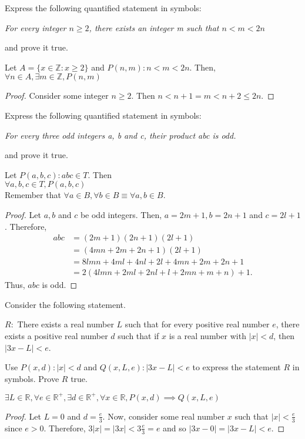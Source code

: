 \documentclass[12pt]{article}
\newcommand{\Z}{\mathbb{Z}}
\newcommand{\R}{\mathbb{R}}
\newenvironment{problem}[2][Problem]{\begin{trivlist}
		\item[\hskip \labelsep {\bfseries #1}\hskip \labelsep {\bfseries #2.}]}{\end{trivlist}}
\newenvironment{solution}[2][Solution]{\begin{trivlist}
		\item[\hskip \labelsep {\bfseries #1}\hskip \labelsep {\bfseries #2.}]}{\end{trivlist}}
\begin{document}
	\begin{problem}{14}
		Express the following quantified statement in symbols:
		\begin{center}
			\textit{For every integer $n\geq 2$, there exists an integer m such that $n<m<2n$}
		\end{center}
		and prove it true.
		\begin{solution}{}
			Let $A=\{x\in \Z: x\geq 2\}$ and $P(n,m):n<m<2n$. Then, \\
			$\forall n\in A, \exists m\in \Z, P(n,m)$ 
			\begin{proof}
				Consider some integer $n\geq 2$. Then $n < n+1 = m < n+2 \leq 2n$. 
			\end{proof}
		\end{solution}
	\end{problem}

	\begin{problem}{24}
		Express the following quantified statement in symbols:
		\begin{center}
			\textit{For every three odd integers a, b and c, their product abc is odd.}
		\end{center}
		and prove it true.
		\begin{solution}{}
			Let $P(a,b,c): abc\in T$. Then\\
			$\forall a,b,c\in T, P(a,b,c)$\\
			Remember that $\forall a\in B, \forall b\in B \equiv \forall a,b \in B$.
			\begin{proof}
				Let $a,b$ and $c$ be odd integers. Then, $a= 2m +1, b=2n+1$ and $c= 2l+1$. Therefore, 
				\begin{align*}
					abc &= (2m+1)(2n+1)(2l+1)\\
					&= (4mn+2m+2n+1)(2l+1)\\
					&= 8lmn+4ml+4nl+2l+4mn+2m+2n+1\\
					&= 2(4lmn+2ml+2nl+l+2mn+m+n)+1.
				\end{align*}
			Thus, $abc$ is odd.
			\end{proof}
		\end{solution}
	\end{problem}

	\begin{problem}{25}
		Consider the following statement.
		\begin{center}
			$R:$ There exists a real number $L$ such that for every positive real number $e$, there exists a positive real number $d$ such that if $x$ is a real number with $|x|< d$, then $|3x-L|< e$.
		\end{center}
	Use $P(x,d): |x| < d$ and $Q(x,L,e): |3x-L|<e$ to express the statement $R$ in symbols. Prove $R$ true.
	\begin{solution}{}
		$\exists L\in \R, \forall e\in \R^{+}, \exists d\in \R^{+}, \forall x\in \R, P(x,d) \implies Q(x,L,e)$
		\begin{proof}
			Let $L=0$ and $d=\frac{e}{3}$. Now, consider some real number $x$ such that $|x| < \frac{e}{3}$ since $e>0$. Therefore,
			$3|x| = |3x| < 3\frac{e}{3} = e$ and so $|3x-0| = |3x-L| < e $.  
		\end{proof}
	\end{solution}
	\end{problem}
	
\end{document}
